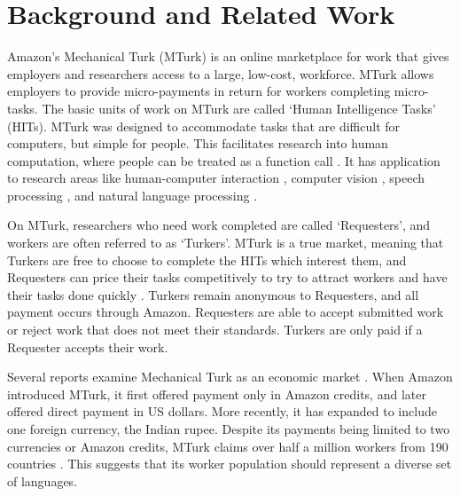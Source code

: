 \documentclass[11pt]{article}
\begin{document}
\section{Background and Related Work}
Amazon's Mechanical Turk (MTurk) is an online marketplace for work that gives employers and researchers access to a large, low-cost, workforce. MTurk allows employers to provide micro-payments in return for workers completing micro-tasks.  The basic units of work on MTurk are called `Human Intelligence Tasks' (HITs).  MTurk was designed to accommodate tasks that are difficult for computers, but simple for people. This facilitates research into human computation, where people can be treated as a function call \cite{vonAhnThesis,Little2009,quinn-bederson:2011}.  It has application to research areas like human-computer interaction \cite{bigham-et-al:2010,bernstein-et-al:2010}, computer vision  \cite{sorkin-forsyth:2008,deng-et-al:2010,rashtchian:10}, speech processing \cite{marge:10,lane-EtAl:2010:MTURK,Parent-Eskenazi:2011,Eskenazi:2013:crowdsourcing-speech-book},  and natural language processing \cite{Snow2008,callisonburch-dredze:2010:MTURK,laws-scheible-schutze:2011:EMNLP}. 

\nocite{novotney-callisonburch:2010:NAACLHLT}

On MTurk, researchers who need work completed are called `Requesters', and workers are often referred to as `Turkers'.  MTurk is a true market, meaning that Turkers are free to choose to complete the HITs which interest them, and Requesters can price their tasks competitively to try to attract workers and have their tasks done quickly \cite{faridani-et-al:2011,singer-mittal:2011}. Turkers remain anonymous to Requesters, \nocite{Lease2013}
and all payment occurs through Amazon. Requesters are able to accept submitted work or reject work that does not meet their standards.  Turkers are only paid if a Requester accepts their work. 

Several reports examine Mechanical Turk as an economic market \cite{ipeirotis:2010:marketplace,lehdonvirta-ernkvist:2011}.  When Amazon introduced MTurk, it first offered payment only in Amazon credits, and later offered direct payment in US dollars. More recently, it has expanded to include one foreign currency, the Indian rupee. Despite its payments being limited to two currencies or Amazon credits, MTurk claims over half a million workers from 190 countries \cite{AmazonRequesterTour}.  This suggests that its worker population should represent a diverse set of languages.
\end{document}
